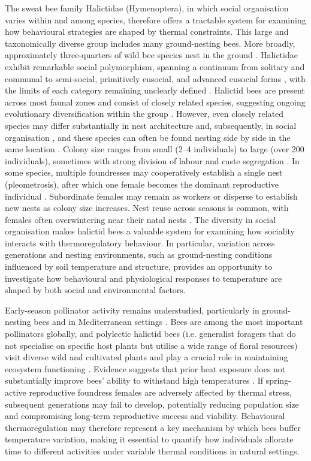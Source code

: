 \documentclass[11pt,a4paper]{article}
\begin{document}
The sweat bee family Halictidae (Hymenoptera), in which social organisation varies within and among species, therefore offers a tractable system for examining how behavioural strategies are shaped by thermal constraints. This large and taxonomically diverse group includes many ground-nesting bees. More broadly, approximately three-quarters of wild bee species nest in the ground \citep{Antoine2021, Knerer1969, Fawcett2019}. Halictidae exhibit remarkable social polymorphism, spanning a continuum from solitary and communal to semi-social, primitively eusocial, and advanced eusocial forms \citep{Eickwort1996, Richards2000, Dunn2003}, with the limits of each category remaining unclearly defined \citep{Antoine2021}. Halictid bees are present across most faunal zones and consist of closely related species, suggesting ongoing evolutionary diversification within the group \citep{Richards1953}. However, even closely related species may differ substantially in nest architecture \citep{Knerer1969} and, subsequently, in social organisation \citep{Packer1985, Schwarz2007}, and these species can often be found nesting side by side in the same location \citep{Knerer1969, Batra1966}. Colony size ranges from small (2–4 individuals) to large (over 200 individuals), sometimes with strong division of labour and caste segregation \citep{Lienhard2010}. In some species, multiple foundresses may cooperatively establish a single nest (pleometrosis), after which one female becomes the dominant reproductive individual \citep{Packer1986a}. Subordinate females may remain as workers or disperse to establish new nests as colony size increases. Nest reuse across seasons is common, with females often overwintering near their natal nests \citep{Kukuk2002}. The diversity in social organisation makes halictid bees a valuable system for examining how sociality interacts with thermoregulatory behaviour. In particular, variation across generations and nesting environments, such as ground-nesting conditions influenced by soil temperature and structure, provides an opportunity to investigate how behavioural and physiological responses to temperature are shaped by both social and environmental factors.

Early-season pollinator activity remains understudied, particularly in ground-nesting bees and in Mediterranean settings \citep{Harmon2020}. Bees are among the most important pollinators globally, and polylectic halictid bees (i.e. generalist foragers that do not specialise on specific host plants but utilise a wide range of floral resources) visit diverse wild and cultivated plants and play a crucial role in maintaining ecosystem functioning \citep{Corbet1993}. Evidence suggests that prior heat exposure does not substantially improve bees’ ability to withstand high temperatures \citep{Gonzalez2024}. If spring-active reproductive foundress females are adversely affected by thermal stress, subsequent generations may fail to develop, potentially reducing population size and compromising long-term reproductive success and viability. Behavioural thermoregulation may therefore represent a key mechanism by which bees buffer temperature variation, making it essential to quantify how individuals allocate time to different activities under variable thermal conditions in natural settings. 
\end{document}
